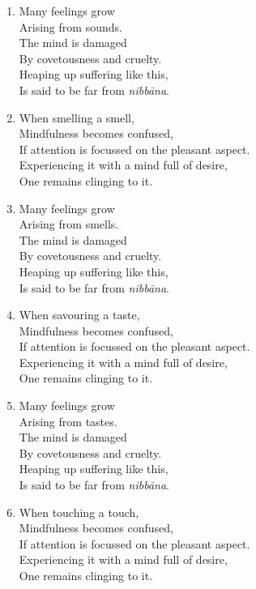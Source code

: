 \documentclass[10pt, openany]{book}
\begin{document}
\begin{enumerate}
\item Many feelings grow\\
Arising from sounds.\\
The mind is damaged\\
By covetousness and cruelty.\\
Heaping up suffering like this,\\
Is said to be far from \emph{nibbāna}.

\item When smelling a smell, \\
Mindfulness becomes confused,\\
If attention is focussed on the pleasant aspect.\\
Experiencing it with a mind full of desire,\\
One remains clinging to it.

\item Many feelings grow\\
Arising from smells.\\
The mind is damaged\\
By covetousness and cruelty.\\
Heaping up suffering like this,\\
Is said to be far from \emph{nibbāna}.

\item When savouring a taste, \\
Mindfulness becomes confused,\\
If attention is focussed on the pleasant aspect.\\
Experiencing it with a mind full of desire,\\
One remains clinging to it.

\item Many feelings grow\\
Arising from tastes.\\
The mind is damaged\\
By covetousness and cruelty.\\
Heaping up suffering like this,\\
Is said to be far from \emph{nibbāna}.

\item When touching a touch, \\
Mindfulness becomes confused,\\
If attention is focussed on the pleasant aspect.\\
Experiencing it with a mind full of desire,\\
One remains clinging to it.


\end{enumerate}
\end{document}
